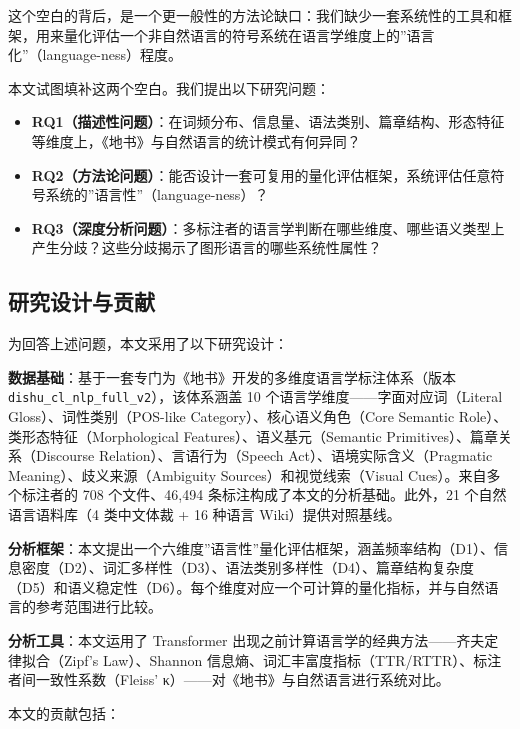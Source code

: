 \documentclass[12pt,a4paper,UTF8,fontset=founder]{ctexart}
\begin{document}
这个空白的背后，是一个更一般性的方法论缺口：我们缺少一套系统性的工具和框架，用来量化评估一个非自然语言的符号系统在语言学维度上的''语言化''（language-ness）程度。

本文试图填补这两个空白。我们提出以下研究问题：

\begin{itemize}

\item
  \textbf{RQ1（描述性问题）}：在词频分布、信息量、语法类别、篇章结构、形态特征等维度上，《地书》与自然语言的统计模式有何异同？
\item
  \textbf{RQ2（方法论问题）}：能否设计一套可复用的量化评估框架，系统评估任意符号系统的''语言性''（language-ness）？
\item
  \textbf{RQ3（深度分析问题）}：多标注者的语言学判断在哪些维度、哪些语义类型上产生分歧？这些分歧揭示了图形语言的哪些系统性属性？
\end{itemize}

\subsection{研究设计与贡献}\label{ux7814ux7a76ux8bbeux8ba1ux4e0eux8d21ux732e}

为回答上述问题，本文采用了以下研究设计：

\textbf{数据基础}：基于一套专门为《地书》开发的多维度语言学标注体系（版本 \texttt{dishu\_cl\_nlp\_full\_v2}），该体系涵盖 10 个语言学维度------字面对应词（Literal Gloss）、词性类别（POS-like Category）、核心语义角色（Core Semantic Role）、类形态特征（Morphological Features）、语义基元（Semantic Primitives）、篇章关系（Discourse Relation）、言语行为（Speech Act）、语境实际含义（Pragmatic Meaning）、歧义来源（Ambiguity Sources）和视觉线索（Visual Cues）。来自多个标注者的 708 个文件、46,494 条标注构成了本文的分析基础。此外，21 个自然语言语料库（4 类中文体裁 + 16 种语言 Wiki）提供对照基线。

\textbf{分析框架}：本文提出一个六维度''语言性''量化评估框架，涵盖频率结构（D1）、信息密度（D2）、词汇多样性（D3）、语法类别多样性（D4）、篇章结构复杂度（D5）和语义稳定性（D6）。每个维度对应一个可计算的量化指标，并与自然语言的参考范围进行比较。

\textbf{分析工具}：本文运用了 Transformer 出现之前计算语言学的经典方法------齐夫定律拟合（Zipf's Law）、Shannon 信息熵、词汇丰富度指标（TTR/RTTR）、标注者间一致性系数（Fleiss' κ）------对《地书》与自然语言进行系统对比。

本文的贡献包括：
\end{document}
